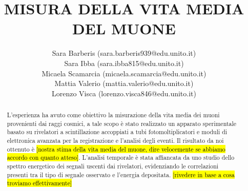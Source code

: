 \documentclass[a4paper, 11pt]{article}
\title{\textbf{MISURA DELLA VITA MEDIA DEL MUONE}}
\author{Sara Barberis (sara.barberis939@edu.unito.it)
\\ Sara Ibba (sara.ibba815@edu.unito.it)
\\ Micaela Scamarcia (micaela.scamarcia@edu.unito.it)
\\ Mattia Valerio (mattia.valerio@edu.unito.it)
\\ Lorenzo Visca (lorenzo.visca846@edu.unito.it)}
\date{}
\newcommand{\WIP}[1]{{\sethlcolor{cyan}\hl{#1}}}
\begin{document}
\maketitle

\begin{center}
\vspace{60pt}

\vspace{60pt}
\end{center}


\newpage

\begin{abstract}
    L'esperienza ha avuto come obiettivo la misurazione della vita media dei muoni provenienti dai raggi cosmici, a tale scopo è stato realizzato un apparato sperimentale basato su rivelatori a scintillazione accoppiati a tubi fotomoltiplicatori e moduli di elettronica avanzata per la registrazione e l'analisi degli eventi.
    Il risultato da noi ottenuto è \WIP{[nostra stima della vita media del muone, dire velocemente se abbiamo accordo con quanto atteso]}.
    L'analisi temporale è stata affiancata da uno studio dello spettro energetico dei segnali uscenti dai rivelatori, evidenziando le correlazioni presenti tra il tipo di segnale osservato e l'energia depositata. \WIP{[rivedere in base a cosa troviamo effettivamente]}
  
\end{abstract}
\end{document}
